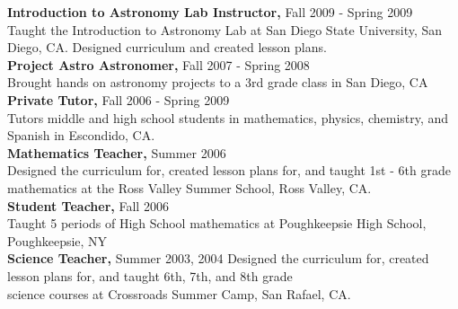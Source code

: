 \documentclass{res}
\begin{document}
\begin{resume}
   {\bf  Introduction to Astronomy Lab Instructor,} Fall 2009 - Spring 2009  \\
         Taught the Introduction to Astronomy Lab at San Diego State University, San Diego, CA. 
         Designed curriculum and created lesson plans. \\
         
   {\bf Project Astro Astronomer, } Fall 2007 - Spring 2008 \\
   		Brought hands on astronomy projects to a 3rd grade class in San Diego, CA \\

   {\bf Private Tutor, } Fall 2006 - Spring 2009 \\
   		Tutors middle and high school students in mathematics, physics, chemistry, and Spanish in Escondido, CA. \\
   		
   {\bf Mathematics Teacher, } Summer 2006 \\
   		Designed the curriculum for, created lesson plans for, and taught 1st - 6th grade 
   		mathematics at the Ross Valley Summer School, Ross Valley, CA. \\
   	
   {\bf Student Teacher, } Fall 2006 \\
   		Taught 5 periods of High School mathematics at Poughkeepsie High School, Poughkeepsie, NY \\
   	
   {\bf Science Teacher, } Summer 2003, 2004
   		Designed the curriculum for, created lesson plans for, and taught 6th, 7th, and 8th grade \\
   		science courses at Crossroads Summer Camp, San Rafael, CA.


\end{resume}
\end{document}
